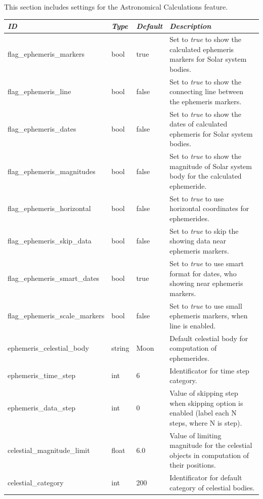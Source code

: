 This section includes settings for the Astronomical Calculations feature.

\noindent%
\begin{longtable}{l|l|l|p{65mm}}
\toprule
\emph{ID}                   & \emph{Type} & \emph{Default} & \emph{Description}\\\midrule
flag\_ephemeris\_markers       & bool   & true  & Set to \emph{true} to show the calculated ephemeris markers for Solar system bodies.\\%
flag\_ephemeris\_line          & bool   & false & Set to \emph{true} to show the connecting line between the ephemeris markers.\\%
flag\_ephemeris\_dates         & bool   & false & Set to \emph{true} to show the dates of calculated ephemeris for Solar system bodies.\\%
flag\_ephemeris\_magnitudes    & bool   & false & Set to \emph{true} to show the magnitude of Solar system body for the calculated ephemeride.\\%
flag\_ephemeris\_horizontal    & bool   & false & Set to \emph{true} to use horizontal coordinates for ephemerides.\\%
flag\_ephemeris\_skip\_data    & bool   & false & Set to \emph{true} to skip the showing data near ephemeris markers.\\%
flag\_ephemeris\_smart\_dates  & bool   & true  & Set to \emph{true} to use smart format for dates, who showing near ephemeris markers.\\%
flag\_ephemeris\_scale\_markers  & bool   & false  & Set to \emph{true} to use small ephemeris markers, when line is enabled.\\%
ephemeris\_celestial\_body     & string & Moon  & Default celestial body for computation of ephemerides.\\%
ephemeris\_time\_step          & int    & 6     & Identificator for time step category.\\%
ephemeris\_data\_step          & int    & 0     & Value of skipping step when skipping option is enabled (label each N steps, where N is step).\\%
celestial\_magnitude\_limit    & float  & 6.0   & Value of limiting magnitude for the celestial objects in computation of their positions.\\%
celestial\_category            & int    & 200   & Identificator for default category of celestial bodies.\\%

\end{longtable}
